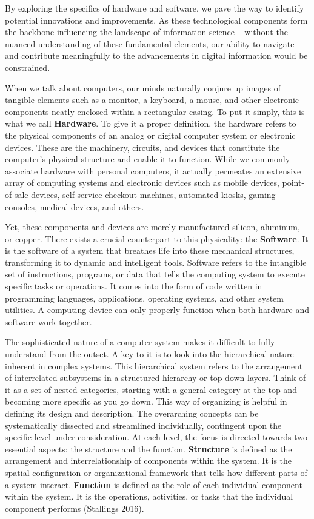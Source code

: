 \documentclass[
  letterpaper,
  DIV=11,
  numbers=noendperiod]{scrreprt}
\begin{document}
By exploring the specifics of hardware and software, we pave the way to
identify potential innovations and improvements. As these technological
components form the backbone influencing the landscape of information
science -- without the nuanced understanding of these fundamental
elements, our ability to navigate and contribute meaningfully to the
advancements in digital information would be constrained.

When we talk about computers, our minds naturally conjure up images of
tangible elements such as a monitor, a keyboard, a mouse, and other
electronic components neatly enclosed within a rectangular casing. To
put it simply, this is what we call \textbf{Hardware}. To give it a
proper definition, the hardware refers to the physical components of an
analog or digital computer system or electronic devices. These are the
machinery, circuits, and devices that constitute the computer's physical
structure and enable it to function. While we commonly associate
hardware with personal computers, it actually permeates an extensive
array of computing systems and electronic devices such as mobile
devices, point-of-sale devices, self-service checkout machines,
automated kiosks, gaming consoles, medical devices, and others.

Yet, these components and devices are merely manufactured silicon,
aluminum, or copper. There exists a crucial counterpart to this
physicality: the \textbf{Software}. It is the software of a system that
breathes life into these mechanical structures, transforming it to
dynamic and intelligent tools. Software refers to the intangible set of
instructions, programs, or data that tells the computing system to
execute specific tasks or operations. It comes into the form of code
written in programming languages, applications, operating systems, and
other system utilities. A computing device can only properly function
when both hardware and software work together.

The sophisticated nature of a computer system makes it difficult to
fully understand from the outset. A key to it is to look into the
hierarchical nature inherent in complex systems. This hierarchical
system refers to the arrangement of interrelated subsystems in a
structured hierarchy or top-down layers. Think of it as a set of nested
categories, starting with a general category at the top and becoming
more specific as you go down. This way of organizing is helpful in
defining its design and description. The overarching concepts can be
systematically dissected and streamlined individually, contingent upon
the specific level under consideration. At each level, the focus is
directed towards two essential aspects: the structure and the function.
\textbf{Structure} is defined as the arrangement and interrelationship
of components within the system. It is the spatial configuration or
organizational framework that tells how different parts of a system
interact. \textbf{Function} is defined as the role of each individual
component within the system. It is the operations, activities, or tasks
that the individual component performs (Stallings 2016).
\end{document}
